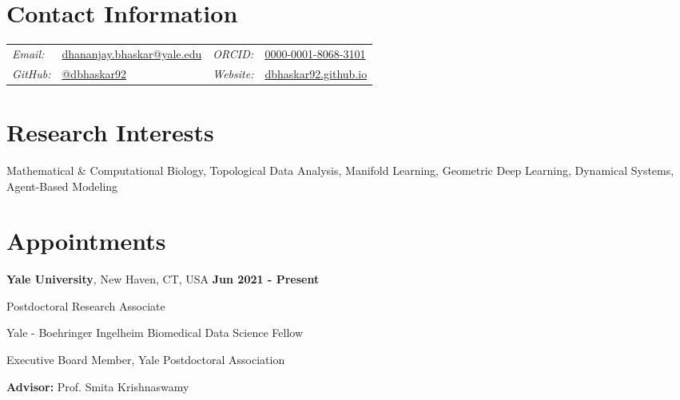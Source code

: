 \documentclass[margin,line]{res}
\newenvironment{list1}{
  \begin{list}{\ding{113}}{
      \setlength{\itemsep}{0in}
      \setlength{\parsep}{0in} \setlength{\parskip}{0in}
      \setlength{\topsep}{0in} \setlength{\partopsep}{0in}
      \setlength{\leftmargin}{0.17in}}}{\end{list}}
\begin{document}
\pagestyle{plain}


\begin{resume}

\vspace*{.2cm}

\section{\sc Contact Information}

\renewcommand{\arraystretch}{1.1}
\begin{tabular}{@{}p{1.8cm}p{6.3cm}p{2.1cm}p{4cm}}
{\it Email:} & \href{mailto:dhananjay.bhaskar@yale.edu}{dhananjay.bhaskar@yale.edu} & {\it ORCID:} & \href{https://orcid.org/0000-0001-8068-3101}{0000-0001-8068-3101} \\
{\it GitHub:} & \href{https://github.com/dbhaskar92}{@dbhaskar92} & {\it Website:} & \href{https://dbhaskar92.github.io/}{dbhaskar92.github.io}
\end{tabular}

\vspace*{.05cm}

\section{\sc Research Interests} Mathematical \& Computational Biology, Topological Data Analysis, Manifold Learning, Geometric Deep Learning, Dynamical Systems, Agent-Based Modeling 
\vspace*{.05cm}

\section{\sc Appointments}

{\bf Yale University}, New Haven, CT, USA  \hfill {\bf Jun 2021 - Present}\\
\vspace*{-.2cm}
\begin{list1}
\setlength\itemsep{0.22em}
\item[] Postdoctoral Research Associate
\item[] Yale - Boehringer Ingelheim Biomedical Data Science Fellow
\item[] Executive Board Member, Yale Postdoctoral Association
\vspace*{.1cm}
\item[] {\bf Advisor:} Prof. Smita Krishnaswamy
\end{list1}


\end{resume}
\end{document}
